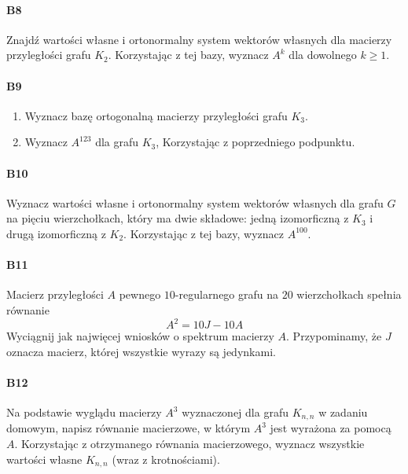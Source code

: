 \documentclass[a4paper,12pt]{article}
\theoremstyle{definition}%
\theoremstyle{definition}
\theoremstyle{problem}
\begin{document}
\paragraph{B8} Znajdź wartości własne i ortonormalny system wektorów własnych dla macierzy przyległości grafu $K_2$. Korzystając z tej bazy, wyznacz $A^k$ dla dowolnego $k \geq 1$.

\paragraph{B9}
\begin{enumerate}[label=\alph*)]
\item Wyznacz bazę ortogonalną macierzy przyległości grafu $K_3$.
\item Wyznacz $A^{123}$ dla grafu $K_3$, Korzystając z poprzedniego podpunktu.
\end{enumerate}

\paragraph{B10} Wyznacz wartości własne i ortonormalny system wektorów własnych dla grafu $G$ na pięciu wierzchołkach, który ma dwie składowe: jedną izomorficzną z $K_3$ i drugą izomorficzną z $K_2$. Korzystając z tej bazy, wyznacz $A^{100}$.

\paragraph{B11} Macierz przyległości $A$ pewnego $10$-regularnego grafu na $20$ wierzchołkach spełnia równanie $$A^2 = 10J - 10A$$ Wyciągnij jak najwięcej wniosków o spektrum macierzy $A$. Przypominamy, że $J$ oznacza macierz, której wszystkie wyrazy są jedynkami.

\paragraph{B12} Na podstawie wyglądu macierzy $A^3$ wyznaczonej dla grafu $K_{n,n}$ w zadaniu domowym, napisz równanie macierzowe, w którym $A^3$ jest wyrażona za pomocą $A$. Korzystając z otrzymanego równania macierzowego, wyznacz wszystkie wartości własne $K_{n,n}$ (wraz z krotnościami).
\end{document}
